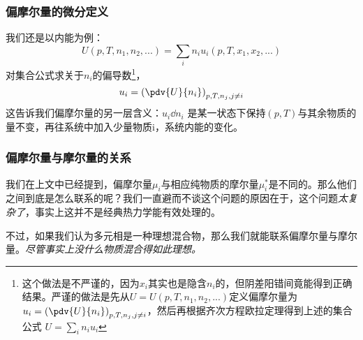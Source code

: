 \subsubsection{偏摩尔量的微分定义}
我们还是以内能为例：
$$ U (p, T, n_1, n_2, ...) = \sum_i n_i u_i(p, T, x_1, x_2, ...) $$
对集合公式求关于$n_i$的偏导数\footnote{这个做法是不严谨的，因为$x_i$其实也是隐含$n_i$的，但阴差阳错间竟能得到正确结果。严谨的做法是先从$U=U(p,T,n_1, n_2,...)$定义偏摩尔量为 ${u_i} = \left(\pdv{U}{n_i}\right)_{p,T,n_j, j \neq i}$，然后再根据齐次方程欧拉定理得到上述的集合公式 $ U = \sum_i n_i u_i $}，
$$
{u_i} = \left(\pdv{U}{n_i}\right)_{p,T,n_j, j \neq i} 
$$
这告诉我们偏摩尔量的另一层含义：$u_i \dd n_i$ 是某一状态下保持$(p,T)$与其余物质的量不变，再往系统中加入少量物质i，系统内能的变化。

\subsubsection{偏摩尔量与摩尔量的关系}
我们在上文中已经提到，偏摩尔量$\mu_i$与相应纯物质的摩尔量$\mu_i^*$是不同的。那么他们之间到底是怎么联系的呢？我们一直避而不谈这个问题的原因在于，这个问题\textsl{太复杂了}，事实上这并不是经典热力学能有效处理的。

不过，如果我们认为多元相是一种理想混合物，那么我们就能联系偏摩尔量与摩尔量。\textsl{尽管事实上没什么物质混合得如此理想。}



